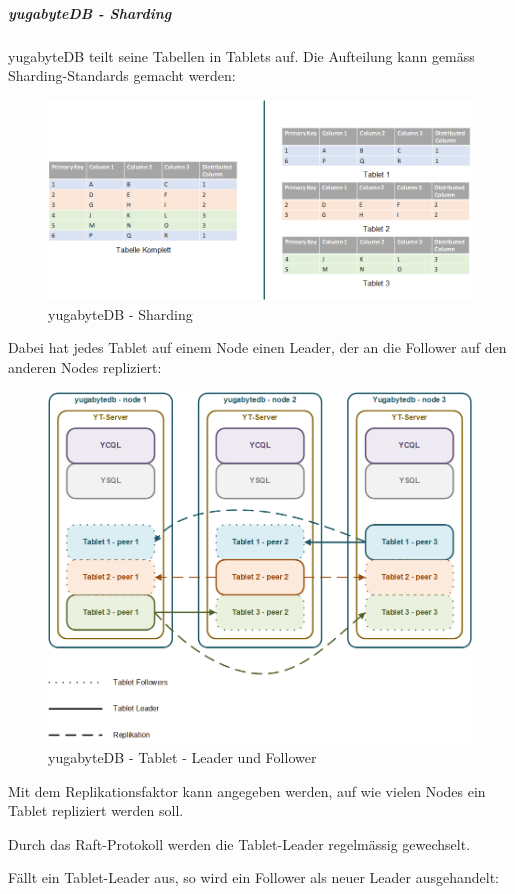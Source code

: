 \begin{flushleft}
    \subparagraph{yugabyteDB - Sharding}
    yugabyteDB teilt seine Tabellen in Tablets auf.
    Die Aufteilung kann gemäss Sharding-Standards gemacht werden:
    \begin{figure}[H]
        \centering
        \includegraphics[width=0.8\linewidth]{source/implementation/evaluation/postgresql_ha_solutions/yugabytedb/yugabytedb-sharding-tablets}
        \caption{yugabyteDB - Sharding}
        \label{fig:yugabytedb-sharding-tablets}
    \end{figure}

    Dabei hat jedes Tablet auf einem Node einen Leader, der an die Follower auf den anderen Nodes repliziert:
    \begin{figure}[H]
        \centering
        \includegraphics[width=0.8\linewidth]{source/implementation/evaluation/postgresql_ha_solutions/yugabytedb/yugabytedb-tablet-masters}
        \caption{yugabyteDB - Tablet - Leader und Follower}
        \label{fig:yugabytedb-tablet-masters}
    \end{figure}

    Mit dem Replikationsfaktor kann angegeben werden, auf wie vielen Nodes ein Tablet repliziert werden soll.

    Durch das Raft-Protokoll werden die Tablet-Leader regelmässig gewechselt.

    Fällt ein Tablet-Leader aus, so wird ein Follower als neuer Leader ausgehandelt:





\end{flushleft}

